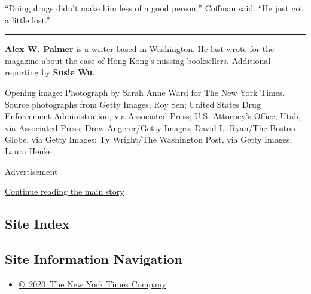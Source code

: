 ``Doing drugs didn't make him less of a good person,'' Coffman said.
``He just got a little lost.''

\begin{center}\rule{0.5\linewidth}{\linethickness}\end{center}

\textbf{Alex W. Palmer} is a writer based in Washington.
\href{https://www.nytimes3xbfgragh.onion/2018/04/03/magazine/the-case-of-hong-kongs-missing-booksellers.html}{He
last wrote for the magazine about the case of Hong Kong's missing
booksellers.} Additional reporting by \textbf{Susie Wu}.

Opening image: Photograph by Sarah Anne Ward for The New York Times.
Source photographs from Getty Images; Roy Sen; United States Drug
Enforcement Administration, via Associated Press; U.S. Attorney's
Office, Utah, via Associated Press; Drew Angerer/Getty Images; David L.
Ryan/The Boston Globe, via Getty Images; Ty Wright/The Washington Post,
via Getty Images; Laura Henke.

Advertisement

\protect\hyperlink{after-bottom}{Continue reading the main story}

\hypertarget{site-index}{%
\subsection{Site Index}\label{site-index}}

\hypertarget{site-information-navigation}{%
\subsection{Site Information
Navigation}\label{site-information-navigation}}

\begin{itemize}
\tightlist
\item
  \href{https://help.nytimes3xbfgragh.onion/hc/en-us/articles/115014792127-Copyright-notice}{©~2020~The
  New York Times Company}
\end{itemize}

